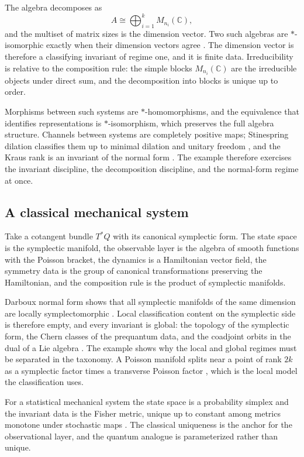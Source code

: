 \documentclass[11pt,letterpaper]{article}
\theoremstyle{definition}
\theoremstyle{remark}
\begin{document}
The algebra decomposes as
\[
  A \cong \bigoplus_{i=1}^{k} M_{n_i}(\mathbb{C}),
\]
and the multiset of matrix sizes is the dimension vector. Two such algebras are $*$-isomorphic exactly when their dimension vectors agree \cite{corpus-9}. The dimension vector is therefore a classifying invariant of regime one, and it is finite data. Irreducibility is relative to the composition rule: the simple blocks $M_{n_i}(\mathbb{C})$ are the irreducible objects under direct sum, and the decomposition into blocks is unique up to order.

Morphisms between such systems are $*$-homomorphisms, and the equivalence that identifies representations is $*$-isomorphism, which preserves the full algebra structure. Channels between systems are completely positive maps; Stinespring dilation classifies them up to minimal dilation and unitary freedom \cite{corpus-10}, and the Kraus rank is an invariant of the normal form \cite{corpus-11}. The example therefore exercises the invariant discipline, the decomposition discipline, and the normal-form regime at once.

\subsection{A classical mechanical system}

Take a cotangent bundle $T^*Q$ with its canonical symplectic form. The state space is the symplectic manifold, the observable layer is the algebra of smooth functions with the Poisson bracket, the dynamics is a Hamiltonian vector field, the symmetry data is the group of canonical transformations preserving the Hamiltonian, and the composition rule is the product of symplectic manifolds.

Darboux normal form shows that all symplectic manifolds of the same dimension are locally symplectomorphic \cite{corpus-6}. Local classification content on the symplectic side is therefore empty, and every invariant is global: the topology of the symplectic form, the Chern classes of the prequantum data, and the coadjoint orbits in the dual of a Lie algebra \cite{corpus-68}. The example shows why the local and global regimes must be separated in the taxonomy. A Poisson manifold splits near a point of rank $2k$ as a symplectic factor times a transverse Poisson factor \cite{corpus-68}, which is the local model the classification uses.

For a statistical mechanical system the state space is a probability simplex and the invariant data is the Fisher metric, unique up to constant among metrics monotone under stochastic maps \cite{corpus-52}. The classical uniqueness is the anchor for the observational layer, and the quantum analogue is parameterized rather than unique.
\end{document}
